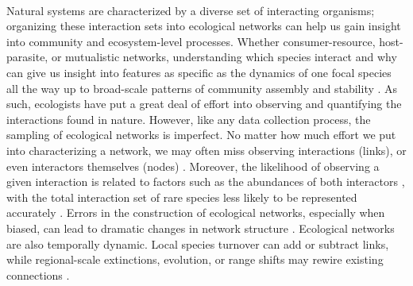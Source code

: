 \paragraph*{}
Natural systems are characterized by a diverse set of interacting organisms; organizing these interaction sets into ecological networks can help us gain insight into community and ecosystem-level processes. Whether consumer-resource, host-parasite, or mutualistic networks, understanding which species interact and why can give us insight into features as specific as the dynamics of one focal species all the way up to broad-scale patterns of community assembly and stability \parencite{guimaraes2020structure, saravia2022ecological}. As such, ecologists have put a great deal of effort into observing and quantifying the interactions found in nature. However, like any data collection process, the sampling of ecological networks is imperfect. No matter how much effort we put into characterizing a network, we may often miss observing interactions (links), or even interactors themselves (nodes) \parencite{Young21}. Moreover, the likelihood of observing a given interaction is related to factors such as the abundances of both interactors \parencite{canard2014empirical}, with the total interaction set of rare species less likely to be represented accurately \parencite{olesen2011missing, cirtwill2019quantitative}. Errors in the construction of ecological networks, especially when biased, can lead to dramatic changes in network structure \parencite{bluthgen2008, Young21}. Ecological networks are also temporally dynamic. Local species turnover can add or subtract links, while regional-scale extinctions, evolution, or range shifts may rewire existing connections \parencite{olesen2011}. 

